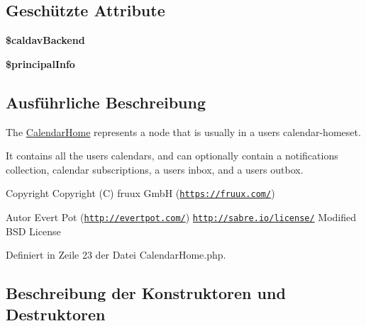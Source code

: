 \subsection*{Geschützte Attribute}
\begin{DoxyCompactItemize}
\item 
\mbox{\label{class_sabre_1_1_cal_d_a_v_1_1_calendar_home_ab563193bab6e19c9cd73eb2ec50416f7}} 
{\bfseries \$caldav\+Backend}
\item 
\mbox{\label{class_sabre_1_1_cal_d_a_v_1_1_calendar_home_ad03928481f9d799706e156661717ad89}} 
{\bfseries \$principal\+Info}
\end{DoxyCompactItemize}


\subsection{Ausführliche Beschreibung}
The \mbox{\hyperlink{class_sabre_1_1_cal_d_a_v_1_1_calendar_home}{Calendar\+Home}} represents a node that is usually in a users\textquotesingle{} calendar-\/homeset.

It contains all the users\textquotesingle{} calendars, and can optionally contain a notifications collection, calendar subscriptions, a users\textquotesingle{} inbox, and a users\textquotesingle{} outbox.

\begin{DoxyCopyright}{Copyright}
Copyright (C) fruux GmbH (\href{https://fruux.com/}{\tt https\+://fruux.\+com/}) 
\end{DoxyCopyright}
\begin{DoxyAuthor}{Autor}
Evert Pot (\href{http://evertpot.com/}{\tt http\+://evertpot.\+com/})  \href{http://sabre.io/license/}{\tt http\+://sabre.\+io/license/} Modified B\+SD License 
\end{DoxyAuthor}


Definiert in Zeile 23 der Datei Calendar\+Home.\+php.



\subsection{Beschreibung der Konstruktoren und Destruktoren}
\mbox{\label{class_sabre_1_1_cal_d_a_v_1_1_calendar_home_a4bba4cdd953eca315348e829e5bb34d8}} 
